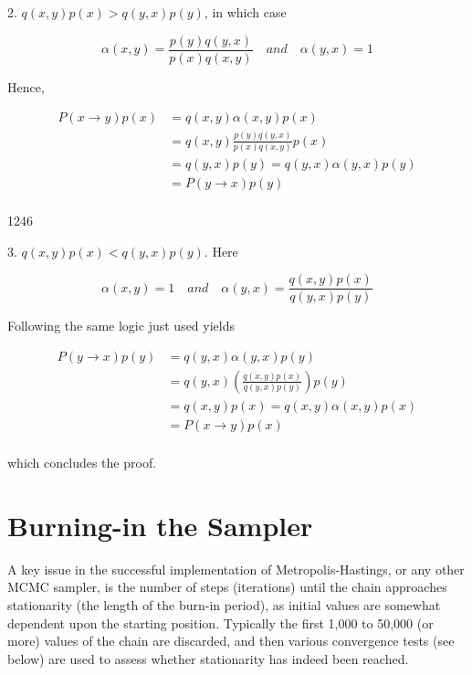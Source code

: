 \documentclass{article}
\begin{document}
2.  $  q(x, y) p(x) > q(y, x) p(y)  $, in which case

\begin{equation}
\alpha(x,y)=\frac{p(y)q(y,x)}{p(x)q(x,y)}\quad and\quad\alpha(y,x)=1
\end{equation}

Hence,

\begin{equation}
\begin{aligned}P(x\rightarrow y)p(x)&=q(x,y)\alpha(x,y)p(x)\\&=q(x,y)\frac{p(y)q(y,x)}{p(x)q(x,y)}p(x)\\&=q(y,x)p(y)=q(y,x)\alpha(y,x)p(y)\\&=P(y\rightarrow x)p(y)\\ \end{aligned}
\end{equation}

1246

3.  $  q(x, y) p(x) < q(y, x) p(y)  $. Here

\begin{equation}
\alpha(x,y)=1\quad and\quad\alpha(y,x)=\frac{q(x,y)p(x)}{q(y,x)p(y)}
\end{equation}

Following the same logic just used yields

\begin{equation}
\begin{aligned}P(y\rightarrow x)p(y)&=q(y,x)\alpha(y,x)p(y)\\&=q(y,x)\left(\frac{q(x,y)p(x)}{q(y,x)p(y)}\right)p(y)\\&=q(x,y)p(x)=q(x,y)\alpha(x,y)p(x)\\&=P(x\rightarrow y)p(x)\\ \end{aligned}
\end{equation}

which concludes the proof.

\section{Burning-in the Sampler}
A key issue in the successful implementation of Metropolis-Hastings, or any other MCMC sampler, is the number of steps (iterations) until the chain approaches stationarity (the length of the burn-in period), as initial values are somewhat dependent upon the starting position. Typically the first 1,000 to 50,000 (or more) values of the chain are discarded, and then various convergence tests (see below) are used to assess whether stationarity has indeed been reached.
\end{document}

